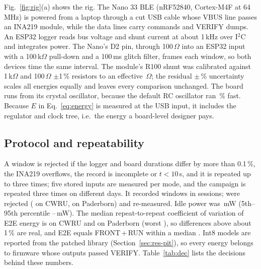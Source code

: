 \documentclass[conference]{IEEEtran}
\newcommand{\mW}{\,mW}
\begin{document}
Fig.~\ref{fig:rig}(a) shows the rig. The Nano 33 BLE (nRF52840, Cortex-M4F at 64\,MHz) is powered from a laptop
through a cut USB cable whose VBUS line passes an INA219 module, while the data lines carry commands and VERIFY dumps.
An ESP32 logger reads bus voltage and shunt current at about 1\,kHz over I$^2$C and integrates power. The Nano's D2
pin, through 100\,$\Omega$ into an ESP32 input with a 100\,k$\Omega$ pull-down and a 100\,ms glitch filter, frames
each window, so both devices time the same interval. The module's R100 shunt was calibrated against 1\,k$\Omega$ and
100\,$\Omega$ $\pm$1\,\% resistors to an effective \NumRigShuntOhm\,$\Omega$; the residual $\pm$\NumRigShuntUnc\,\%
uncertainty scales all energies equally and leaves every comparison unchanged. The board runs from its crystal
oscillator, because the default RC oscillator ran \NumRigRcClockErr\,\% fast. Because $E$ in Eq.~\eqref{eq:energy} is
measured at the USB input, it includes the regulator and clock tree, i.e.\ the energy a board-level designer pays.

\subsection{Protocol and repeatability}
A window is rejected if the logger and board durations differ by more than 0.1\,\%, the INA219 overflows, the record
is incomplete or $t<10$\,s, and it is repeated up to three times; five stored inputs are measured per mode, and the
campaign is repeated three times on different days. It recorded \NumTotWindows{} windows in \NumTotSessions{}
sessions; \NumTotRejected{} were rejected (\NumCwruRejPct{} on CWRU, \NumPuRejPct{} on Paderborn) and re-measured.
Idle power was \NumCwruIdleMed\mW{} (5th--95th percentile \NumCwruIdleLo--\NumCwruIdleHi\mW{}). The median
repeat-to-repeat coefficient of variation of E2E energy is \NumCwruCvMed{} on CWRU and \NumPuCvMed{} on Paderborn
(worst \NumCwruCvMax{}), so differences above about 1\,\% are real, and E2E equals FRONT\,+\,RUN within a median
\NumCwruAddMed{}. Int8 models are reported from the patched library (Section~\ref{sec:res-pit}), so every energy
belongs to firmware whose outputs passed VERIFY. Table~\ref{tab:dec} lists the decisions behind these numbers.
\end{document}

